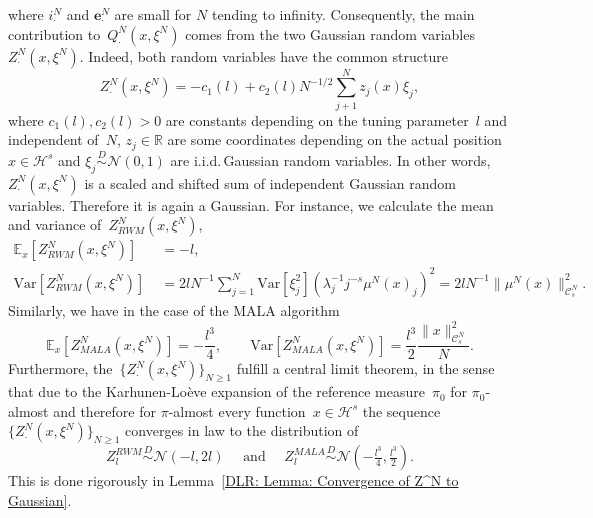 where $i^N_{\cdot}$ and $\textbf{e}^N_{\cdot}$ are small for $N$ tending to infinity. Consequently, the main contribution to~$Q^N_{\cdot}(x, \xi^N)$ comes from the two Gaussian random variables~$Z^N_{\cdot} (x, \xi^N)$. Indeed, both random variables have the common structure
\begin{equation*}
  Z^N_{\cdot} (x, \xi^N)  = - c_1(l) + c_2(l) N^{-1/2} \sum_{j+1}^N z_j(x) \xi_j,
\end{equation*}
where $c_1(l), c_2(l) > 0 $ are constants depending on the tuning parameter~$l$ and independent of~$N$, $z_j \in \mathbb{R}$ are some coordinates depending on the actual position~$x \in \mathcal{H}^s$ and $\xi_j  \stackrel{D}{\sim} \mathcal{N}(0, 1)$ are i.i.d.\,Gaussian random variables. In other words, $Z^N_{\cdot} (x, \xi^N)$ is a scaled and shifted sum of independent Gaussian random variables. Therefore it is again a Gaussian. For instance, we calculate the mean and variance of~$Z^N_{RWM} (x, \xi^N)$,
\begin{equation}
  \label{DLR: Gaussian mean and variance of Z^N RWM}
  \begin{split}
  \mathbb{E}_x[Z^N_{RWM} (x, \xi^N)] & \;= - l, \\
  \text{Var}[Z^N_{RWM} (x, \xi^N)] & \; = 2l N^{-1} \sum_{j=1}^N \text{Var}[\xi_j^2]( \lambda_j^{-1} j^{-s} \mu^N(x)_j)^2 =  2l N^{-1} \|\mu^N(x)\|_{\mathcal{C}_s^N}^2.
  \end{split}
\end{equation}
Similarly, we have in the case of the MALA algorithm
\begin{equation*}
  \mathbb{E}_x[Z^N_{MALA} (x, \xi^N)] = - \frac{l^3}{4}, \qquad \text{Var}[Z^N_{MALA} (x, \xi^N)]  = \frac{l^3}{2} \frac{\|x\|_{\mathcal{C}^N_s}^2}{N}.
\end{equation*}
Furthermore, the~$\{Z^N_{\cdot} (x, \xi^N) \}_{N\geq1}$ fulfill a central limit theorem, in the sense that due to the Karhunen-Lo\`{e}ve expansion of the reference measure~$\pi_0$ for $\pi_0$-almost and therefore for $\pi$-almost every function~$x \in \mathcal{H}^s$ the sequence~$\{Z^N_{\cdot} (x, \xi^N) \}_{N\geq1}$ converges in law to the distribution of
\begin{equation}
  \label{DLR: Claim Convergence of Z^N to Gaussian}
  Z_l^{RWM} \stackrel{D}{\sim} \mathcal{N}(- l, 2l) \quad \text{ and } \quad Z_l^{MALA} \stackrel{D}{\sim} \mathcal{N}(- \tfrac{l^3}{4}, \tfrac{l^3}{2}).
\end{equation}
This is done rigorously in Lemma~\ref{DLR: Lemma: Convergence of Z^N to Gaussian}.


